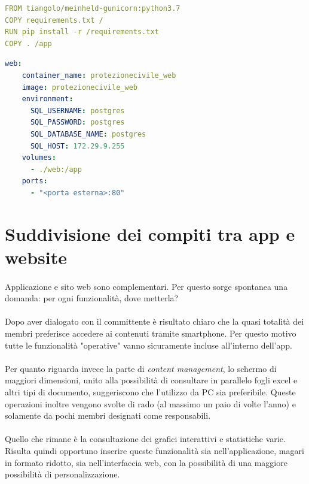 \documentclass[11pt,a4paper,english]{article}
\begin{document}
\begin{lstlisting}[language=yaml, caption=Dockerfile]
FROM tiangolo/meinheld-gunicorn:python3.7
COPY requirements.txt /
RUN pip install -r /requirements.txt
COPY . /app
\end{lstlisting}

\begin{lstlisting}[language=yaml, caption=File di configurazione per Docker compose]
web:
    container_name: protezionecivile_web
    image: protezionecivile_web
    environment:
      SQL_USERNAME: postgres
      SQL_PASSWORD: postgres
      SQL_DATABASE_NAME: postgres
      SQL_HOST: 172.29.9.255
    volumes:
      - ./web:/app
    ports:
      - "<porta esterna>:80"
\end{lstlisting}



\section{Suddivisione dei compiti tra app e website}

\paragraph{} Applicazione e sito web sono complementari. Per questo sorge spontanea una domanda: per ogni funzionalità, dove metterla? 

\paragraph{} Dopo aver dialogato con il committente è risultato chiaro che la quasi totalità dei membri preferisce accedere ai contenuti tramite smartphone. Per questo motivo tutte le funzionalità "operative" vanno sicuramente incluse all'interno dell'app. 

\paragraph{} Per quanto riguarda invece la parte di \emph{content management}, lo schermo di maggiori dimensioni, unito alla possibilità di consultare in parallelo fogli excel e altri tipi di documento, suggeriscono che l'utilizzo da PC sia preferibile. Queste operazioni inoltre vengono svolte di rado (al massimo un paio di volte l'anno) e solamente da pochi membri designati come responsabili. 

\paragraph{} Quello che rimane è la consultazione dei grafici interattivi e statistiche varie. Risulta quindi opportuno inserire queste funzionalità sia nell'applicazione, magari in formato ridotto, sia nell'interfaccia web, con la possibilità di una maggiore possibilità di personalizzazione.
\end{document}
